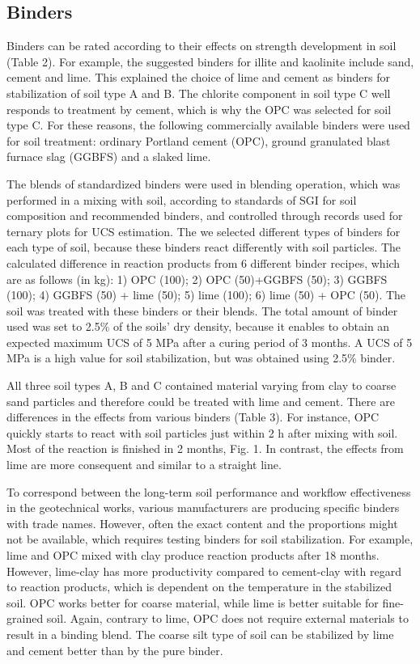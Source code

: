 \documentclass[electronics,article,submit,pdftex,moreauthors]{Definitions/mdpi}
\begin{document}
\subsection{Binders}
Binders can be rated according to their effects on strength development in soil (Table 2). For example, the suggested binders for illite and kaolinite include sand, cement and lime. This explained the choice of lime and cement as binders for stabilization of soil type A and B. The chlorite component in soil type C well responds to treatment by cement, which is why the OPC was selected for soil type C. For these reasons, the following commercially available binders were used for soil treatment: ordinary Portland cement (OPC), ground granulated blast furnace slag (GGBFS) and a slaked lime. 

The blends of standardized binders were used in blending operation, which was performed in a mixing with soil, according to standards of SGI for soil composition and recommended binders, and controlled through records used for ternary plots for UCS estimation. The we selected different types of binders for each type of soil, because these binders react differently with soil particles. The calculated difference in reaction products from 6 different binder recipes, which are as follows (in kg): 1) OPC (100); 2) OPC (50)+GGBFS (50); 3) GGBFS (100); 4) GGBFS (50) + lime (50); 5) lime (100); 6) lime (50) + OPC (50). The soil was treated with these binders or their blends. The total amount of binder used was set to 2.5\% of the soils' dry density, because it enables to obtain an expected maximum UCS of 5 MPa after a curing period of 3 months. A UCS of 5 MPa is a high value for soil stabilization, but was obtained using 2.5\% binder.

All three soil types A, B and C contained material varying from clay to coarse sand particles and therefore could be treated with lime and cement. There are differences in the effects from various binders (Table 3). For instance, OPC quickly starts to react with soil particles just within 2 h after mixing with soil. Most of the reaction is finished in 2 months, Fig. 1. In contrast, the effects from lime are more consequent and similar to a straight line. 

To correspond between the long-term soil performance and workflow effectiveness in the geotechnical works, various manufacturers are producing specific binders with trade names. However, often the exact content and the proportions might not be available, which requires testing binders for soil stabilization. For example, lime and OPC mixed with clay produce reaction products after 18 months. However, lime-clay has more productivity compared to cement-clay with regard to reaction products, which is dependent on the temperature in the stabilized soil. OPC works better for coarse material, while lime is better suitable for fine-grained soil. Again, contrary to lime, OPC does not require external materials to result in a binding blend. The coarse silt type of soil can be stabilized by lime and cement better than by the pure binder.
\end{document}
